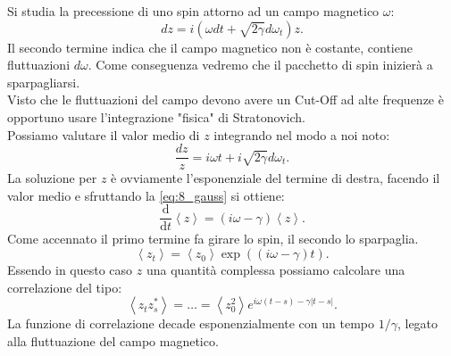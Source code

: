 \begin{exmp}
Si studia la precessione di uno spin attorno ad un campo magnetico $\omega$:
\[
    dz = i\left(\omega dt + \sqrt{2\gamma} d\omega_t\right)z
.\] 
Il secondo termine indica che il campo magnetico non è costante, contiene fluttuazioni $d\omega$. Come conseguenza vedremo che il pacchetto di spin inizierà a sparpagliarsi.\\
Visto che le fluttuazioni del campo devono avere un Cut-Off ad alte frequenze è opportuno usare l'integrazione "fisica" di Stratonovich.\\
Possiamo valutare il valor medio di $z$ integrando nel modo a noi noto:
\[
    \frac{dz}{z}=i\omega t + i\sqrt{2\gamma} d\omega_t
.\] 
La soluzione per $z$ è ovviamente l'esponenziale del termine di destra, facendo il valor medio e sfruttando la \ref{eq:8_gauss} si ottiene:
\[
    \frac{\text{d} }{\text{d} t} \left<z\right> = \left(i\omega-\gamma\right)\left<z\right>
.\] 
Come accennato il primo termine fa girare lo spin, il secondo lo sparpaglia.
\[
    \left<z_t\right> = \left<z_0\right>\exp\left(\left(i\omega-\gamma\right)t\right)
.\] 
Essendo in questo caso $z$ una quantità complessa possiamo calcolare una correlazione del tipo:
\[
    \left<z_tz^*_s\right> =\ldots= \left<z_0^2\right>e^{i\omega\left(t-s\right)-\gamma\left|t-s\right|}
.\] 
La funzione di correlazione decade esponenzialmente con un tempo $1 /\gamma$, legato alla fluttuazione del campo magnetico.
\end{exmp}
\noindent
